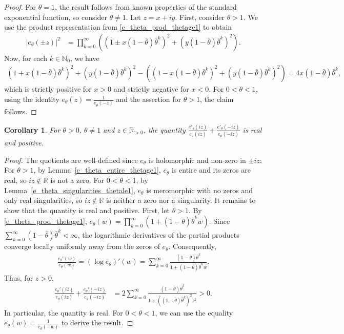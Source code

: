 \documentclass[10pt,a4paper]{amsart}
\newcommand{\N}{\mathbb{N}} %
\newcommand{\R}{\mathbb{R}} %
\newcommand{\1}{\mathds{1}}
\newtheorem{Corollary}[definition]{Corollary}
\begin{document}
\begin{proof}
For $\theta=1$, the result follows from known properties of the standard exponential function, so consider $\theta\ne 1$.
  Let $z=x+iy$. 
  First, consider $\theta >1$. We use the product representation from \eqref{e_theta_prod_thetage1} to obtain
  \begin{align*}
       |e_{\theta}(\pm z)|^2&=\prod_{k=0}^\infty((1 \pm x(1-\bar\theta)\bar\theta^k)^2+(y(1-\bar\theta)\bar\theta^k)^2).
  \end{align*}
  Now, for each $k\in\N_0$, we have
  \begin{align*}
      (1+x(1-\bar\theta)\bar\theta^k)^2+(y(1-\bar\theta)\bar\theta^k)^2-((1-x(1-\bar\theta)\bar\theta^k)^2+(y(1-\bar\theta)\bar\theta^k)^2)=4x(1-\bar\theta)\bar\theta^k,
  \end{align*}
  which is strictly positive for $x>0$ and strictly negative for $x<0$. For $0<\theta<1$, using the identity $e_\theta(z)=\frac{1}{e_{\bar\theta}(-z)}$ and the assertion for $\theta>1$, the claim follows. %
\end{proof}
\begin{Corollary}\label{estimate_pos_e_prime_e}
    For $\theta>0$, $\theta\ne 1$ and $z\in\R_{>0}$, the quantity $\frac{e'_{\theta} (iz)}{e_{\theta} (iz)}+\frac{e'_{\theta}(-iz)}{e_{\theta}(-iz)}$ is real and positive.
\end{Corollary}
\begin{proof}
The quotients are well-defined since $e_\theta$ is holomorphic and non-zero in $\pm iz$: For $\theta>1$, by Lemma~\ref{e_theta_entire_thetage1}, $e_\theta$ is entire and its zeros are real, so $iz\notin \R$ is not a zero. For $0<\theta<1$, by Lemma~\ref{e_theta_singularities_thetale1}, $e_\theta$ is meromorphic with no zeros and only real singularities, so $iz\notin\R$ is neither a zero nor a singularity. It remains to show that the quantity is real and positive.
    First, let $\theta >1$.
    By \eqref{e_theta_prod_thetage1}, $ e_\theta(w)=\prod_{k=0}^\infty(1+(1-\bar\theta)\bar\theta^kw)$.
    Since $\sum_{k=0}^\infty (1-\bar\theta)\bar\theta^k<\infty$, the logarithmic derivatives
    of the partial products converge locally uniformly away from the
    zeros of $e_\theta$. Consequently,
    \begin{align*}
        \frac{e_\theta'(w)}{e_\theta(w)}=(\log e_\theta)'(w)=\sum_{k=0}^\infty\frac{(1-\bar\theta)\bar\theta^k}{1+(1-\bar\theta)\bar\theta^kw}.
    \end{align*}
    Thus, for $z>0$,
    \begin{align*}
        \frac{e_\theta'(iz)}{e_\theta(iz)}
        +\frac{e_\theta'(-iz)}{e_\theta(-iz)}
        &=
        2\sum_{k=0}^\infty
        \frac{(1-\bar\theta)\bar\theta^k}{1+((1-\bar\theta)\bar\theta^k)^2z^2}
        >0.
    \end{align*}
In particular, the quantity is real. For $0<\theta<1$, we can use the equality $e_\theta(w)=\frac{1}{e_{\bar\theta}(-w)}$ to derive the result.
\end{proof}
\end{document}

